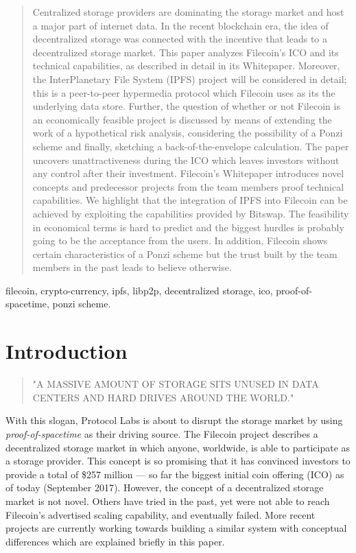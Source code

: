 \documentclass[conference]{IEEEtran}
\begin{document}
\begin{abstract}

Centralized storage providers are dominating the storage market and host a major part of internet data.
In the recent blockchain era, the idea of decentralized storage was connected with the incentive that leads to a decentralized storage market.
This paper analyzes Filecoin's ICO and its technical capabilities, as described in detail in its Whitepaper.
Moreover, the InterPlanetary File System (IPFS) project will be considered in detail; this is a peer-to-peer hypermedia protocol which Filecoin uses as its the underlying data store.
Further, the question of whether or not Filecoin is an economically feasible project is discussed by means of extending the work of a hypothetical risk analysis, considering the possibility of a Ponzi scheme and finally, sketching a back-of-the-envelope calculation.
The paper uncovers unattractiveness during the ICO which leaves investors without any control after their investment.
Filecoin's Whitepaper introduces novel concepts and predecessor projects from the team members proof technical capabilities.
We highlight that the integration of IPFS into Filecoin can be achieved by exploiting the capabilities provided by Bitswap.
The feasibility in economical terms is hard to predict and the biggest hurdles is probably going to be the acceptance from the users.
In addition, Filecoin shows certain characteristics of a Ponzi scheme but the trust built by the team members in the past leads to believe otherwise.

\end{abstract}

\begin{IEEEkeywords}
filecoin, crypto-currency, ipfs, libp2p, decentralized storage, ico, proof-of-spacetime, ponzi scheme.
\end{IEEEkeywords}

\IEEEpeerreviewmaketitle

\section{Introduction}

\begin{quote}"A MASSIVE AMOUNT OF STORAGE SITS UNUSED IN DATA CENTERS AND HARD DRIVES AROUND THE WORLD." \cite{filecoin-io}\end{quote}
With this slogan, Protocol Labs is about to disrupt the storage market by using \textit{proof-of-spacetime} as their driving source.
The Filecoin project describes a decentralized storage market in which anyone, worldwide, is able to participate as a storage provider.
This concept is so promising that it has convinced investors to provide a total of \$257 million –-- so far the biggest initial coin offering (ICO) as of today (September 2017).
However, the concept of a decentralized storage market is not novel.
Others\cite{tribler}\cite{mojo-nation} have tried in the past, yet were not able to reach Filecoin's advertised scaling capability, and eventually failed.
More recent projects\cite{storj}\cite{sia} are currently working towards building a similar system with conceptual differences which are explained briefly in this paper.
\end{document}
